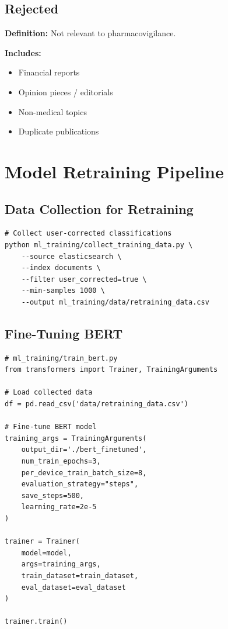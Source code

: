 \subsection{Rejected}

\textbf{Definition:}
Not relevant to pharmacovigilance.

\textbf{Includes:}
\begin{itemize}
    \item Financial reports
    \item Opinion pieces / editorials
    \item Non-medical topics
    \item Duplicate publications
\end{itemize}

\section{Model Retraining Pipeline}

\subsection{Data Collection for Retraining}

\begin{commandbox}
\begin{lstlisting}[style=bashstyle]
# Collect user-corrected classifications
python ml_training/collect_training_data.py \
    --source elasticsearch \
    --index documents \
    --filter user_corrected=true \
    --min-samples 1000 \
    --output ml_training/data/retraining_data.csv
\end{lstlisting}
\end{commandbox}

\subsection{Fine-Tuning BERT}

\begin{lstlisting}[style=pythonstyle]
# ml_training/train_bert.py
from transformers import Trainer, TrainingArguments

# Load collected data
df = pd.read_csv('data/retraining_data.csv')

# Fine-tune BERT model
training_args = TrainingArguments(
    output_dir='./bert_finetuned',
    num_train_epochs=3,
    per_device_train_batch_size=8,
    evaluation_strategy="steps",
    save_steps=500,
    learning_rate=2e-5
)

trainer = Trainer(
    model=model,
    args=training_args,
    train_dataset=train_dataset,
    eval_dataset=eval_dataset
)

trainer.train()
\end{lstlisting}

